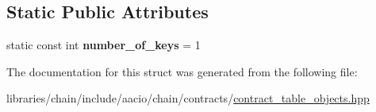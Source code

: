 \subsection*{Static Public Attributes}
\begin{DoxyCompactItemize}
\item 
\mbox{\label{structaacio_1_1chain_1_1contracts_1_1key__value__object_a8364a76477fce3592611a9b29025bee0}} 
static const int {\bfseries number\+\_\+of\+\_\+keys} = 1
\end{DoxyCompactItemize}


The documentation for this struct was generated from the following file\+:\begin{DoxyCompactItemize}
\item 
libraries/chain/include/aacio/chain/contracts/\mbox{\hyperlink{contract__table__objects_8hpp}{contract\+\_\+table\+\_\+objects.\+hpp}}\end{DoxyCompactItemize}
